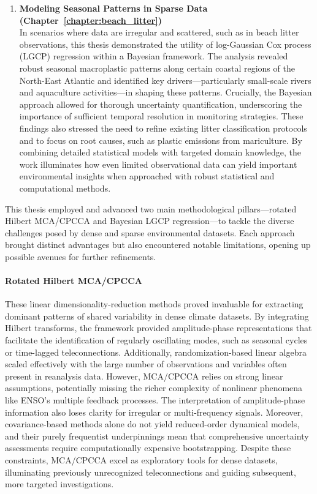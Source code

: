 \begin{enumerate}
    \item \textbf{Modeling Seasonal Patterns in Sparse Data (Chapter~\ref{chapter:beach_litter})}\\In scenarios where data are irregular and scattered, such as in beach litter observations, this thesis demonstrated the utility of log-Gaussian Cox process (LGCP) regression within a Bayesian framework. The analysis revealed robust seasonal macroplastic patterns along certain coastal regions of the North-East Atlantic and identified key drivers—particularly small-scale rivers and aquaculture activities—in shaping these patterns. Crucially, the Bayesian approach allowed for thorough uncertainty quantification, underscoring the importance of sufficient temporal resolution in monitoring strategies. These findings also stressed the need to refine existing litter classification protocols and to focus on root causes, such as plastic emissions from mariculture. By combining detailed statistical models with targeted domain knowledge, the work illuminates how even limited observational data can yield important environmental insights when approached with robust statistical and computational methods.
\end{enumerate}



This thesis employed and advanced two main methodological pillars---rotated Hilbert MCA/CPCCA and Bayesian LGCP regression---to tackle the diverse challenges posed by dense and sparse environmental datasets. Each approach brought distinct advantages but also encountered notable limitations, opening up possible avenues for further refinements.

\paragraph{Rotated Hilbert MCA/CPCCA}
These linear dimensionality-reduction methods proved invaluable for extracting dominant patterns of shared variability in dense climate datasets. By integrating Hilbert transforms, the framework provided amplitude-phase representations that facilitate the identification of regularly oscillating modes, such as seasonal cycles or time-lagged teleconnections. Additionally, randomization-based linear algebra scaled effectively with the large number of observations and variables often present in reanalysis data. However, MCA/CPCCA relies on strong linear assumptions, potentially missing the richer complexity of nonlinear phenomena like ENSO's multiple feedback processes. The interpretation of amplitude-phase information also loses clarity for irregular or multi-frequency signals. Moreover, covariance-based methods alone do not yield reduced-order dynamical models, and their purely frequentist underpinnings mean that comprehensive uncertainty assessments require computationally expensive bootstrapping. Despite these constraints, MCA/CPCCA excel as exploratory tools for dense datasets, illuminating previously unrecognized teleconnections and guiding subsequent, more targeted investigations.

